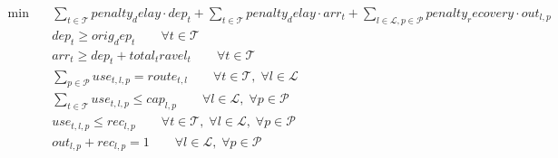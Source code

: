 \begin{align}
  \min\quad & \sum_{t \in \mathcal{T}} penalty_delay \cdot dep_{t} + \sum_{t \in \mathcal{T}} penalty_delay \cdot arr_{t} + \sum_{l \in \mathcal{L}, p \in \mathcal{P}} penalty_recovery \cdot out_{l,p} \tag{obj} \\
  & dep_{t} \ge orig_dep_{t} \qquad \forall t \in \mathcal{T} \tag{dep\_orig} \\
  & arr_{t} \ge dep_{t} + total_travel_{t} \qquad \forall t \in \mathcal{T} \tag{arr\_travel} \\
  & \sum_{p \in \mathcal{P}} use_{t,l,p} = route_{t,l} \qquad \forall t \in \mathcal{T},\; \forall l \in \mathcal{L} \tag{route\_assign} \\
  & \sum_{t \in \mathcal{T}} use_{t,l,p} \le cap_{l,p} \qquad \forall l \in \mathcal{L},\; \forall p \in \mathcal{P} \tag{cap} \\
  & use_{t,l,p} \le rec_{l,p} \qquad \forall t \in \mathcal{T},\; \forall l \in \mathcal{L},\; \forall p \in \mathcal{P} \tag{use\_rec} \\
  & out_{l,p} + rec_{l,p} = 1 \qquad \forall l \in \mathcal{L},\; \forall p \in \mathcal{P} \tag{out\_rec} \\
\end{align}